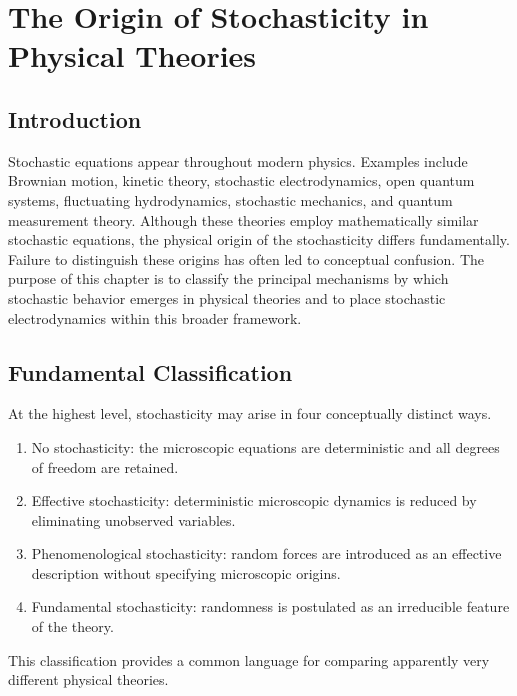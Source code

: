 \chapter{The Origin of Stochasticity in Physical Theories}
\label{ch:OriginStochasticity}
\section{Introduction}
Stochastic equations appear throughout modern physics.
Examples include Brownian motion, kinetic theory, stochastic
electrodynamics, open quantum systems, fluctuating hydrodynamics,
stochastic mechanics, and quantum measurement theory.
Although these theories employ mathematically similar stochastic
equations, the physical origin of the stochasticity differs
fundamentally.
Failure to distinguish these origins has often led to conceptual
confusion.
The purpose of this chapter is to classify the principal mechanisms by
which stochastic behavior emerges in physical theories and to place
stochastic electrodynamics within this broader framework.
\section{Fundamental Classification}
At the highest level, stochasticity may arise in four conceptually
distinct ways.
\begin{enumerate}
\item
No stochasticity: the microscopic equations are deterministic and all
degrees of freedom are retained.
\item
Effective stochasticity: deterministic microscopic dynamics is reduced
by eliminating unobserved variables.
\item
Phenomenological stochasticity: random forces are introduced as an
effective description without specifying microscopic origins.
\item
Fundamental stochasticity: randomness is postulated as an irreducible
feature of the theory.
\end{enumerate}
This classification provides a common language for comparing apparently
very different physical theories.
